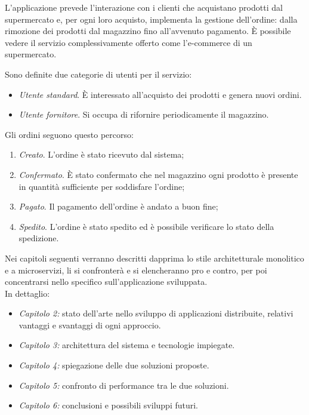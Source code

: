 	L'applicazione prevede l'interazione con i clienti che acquistano prodotti dal supermercato e, per ogni loro acquisto, implementa la gestione dell'ordine: dalla rimozione dei prodotti dal magazzino fino all'avvenuto pagamento.
	\`E possibile vedere il servizio complessivamente offerto come l'e-commerce di un supermercato.
	
	Sono definite due categorie di utenti per il servizio:
	\begin{itemize}
		\item \emph{Utente standard}. \`E interessato all'acquisto dei prodotti e genera nuovi ordini.
		\item \emph{Utente fornitore}. Si occupa di rifornire periodicamente il magazzino.
	\end{itemize}
	
	Gli ordini seguono questo percorso:
	\begin{enumerate}[label=\alph*.]
		\item \emph{Creato}. L'ordine è stato ricevuto dal sistema;
		\item \emph{Confermato}. \`E stato confermato che nel magazzino ogni prodotto è presente in quantità sufficiente per soddisfare l'ordine;
		\item \emph{Pagato}. Il pagamento dell'ordine è andato a buon fine;
		\item \emph{Spedito}. L'ordine è stato spedito ed è possibile verificare lo stato della spedizione.
	\end{enumerate}
	
	
	Nei capitoli seguenti verranno descritti dapprima lo stile architetturale monolitico e a microservizi, li si confronterà e si elencheranno pro e contro, per poi concentrarsi nello specifico sull'applicazione sviluppata.\\
	In dettaglio:
	
	\medskip
	\begin{itemize}
		\item \emph{Capitolo 2:} stato dell'arte nello sviluppo di applicazioni distribuite, relativi vantaggi e svantaggi di ogni approccio.
		\item \emph{Capitolo 3:} architettura del sistema e tecnologie impiegate.
		\item \emph{Capitolo 4:} spiegazione delle due soluzioni proposte.
		\item \emph{Capitolo 5:} confronto di performance tra le due soluzioni.
		\item \emph{Capitolo 6:} conclusioni e possibili sviluppi futuri.
	\end{itemize}